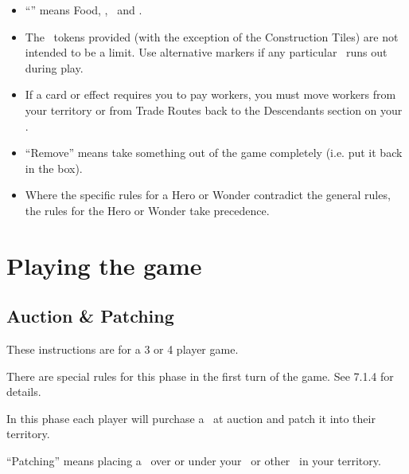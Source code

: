\documentclass[10pt,twocolumn]{article}
\begin{document}
\begin{itemize}
\item ``\goods'' means Food, \minerals, \vps\ and \money.

\item The \goodss\ tokens provided (with the exception of the Construction Tiles) are not intended to be a limit. Use alternative markers if any particular \good\ runs out during play.

\item If a card or effect requires you to pay workers, you must move workers from your territory or from Trade Routes back to the Descendants section on your \psb.

\item ``Remove'' means take something out of the game completely (i.e. put it back in the box).
\item Where the specific rules for a Hero or Wonder contradict the general rules, the rules for the Hero or Wonder take precedence.
\end{itemize}
\section{Playing the game}
\subsection{Auction \& Patching \landcards}
These instructions are for a 3 or 4 player game.

There are special rules for this phase in the first turn of the game. See 7.1.4 for details.

In this phase each player will purchase a \landcard\ at auction and patch it into their territory.

``Patching'' means placing a \landcard\ over or under your \baseland\ or other \landcards\ in your territory.
\end{document}
